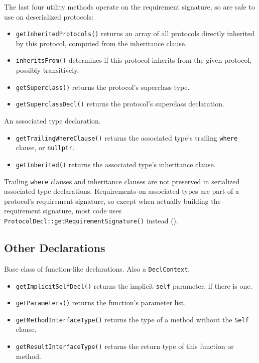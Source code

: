 \documentclass[../generics]{subfiles}
\begin{document}
The last four utility methods operate on the requirement signature, so are safe to use on deserialized protocols:
\begin{itemize}
\item \texttt{getInheritedProtocols()} returns an array of all protocols directly inherited by this protocol, computed from the inheritance clause.
\item \texttt{inheritsFrom()} determines if this protocol inherits from the given protocol, possibly transitively.
\item \texttt{getSuperclass()} returns the protocol's superclass type.
\item \texttt{getSuperclassDecl()} returns the protocol's superclass declaration.
\end{itemize}

An associated type declaration.
\begin{itemize}
\item \texttt{getTrailingWhereClause()} returns the associated type's trailing \texttt{where} clause, or \texttt{nullptr}.
\item \texttt{getInherited()} returns the associated type's inheritance clause.
\end{itemize}

Trailing \texttt{where} clauses and inheritance clauses are not preserved in serialized associated type declarations. Requirements on associated types are part of a protocol's requirement signature, so except when actually building the requirement signature, most code uses \texttt{ProtocolDecl::getRequirementSignature()} instead ().

\subsection*{Other Declarations}

Base class of function-like declarations. Also a \texttt{DeclContext}.
\begin{itemize}
\item \texttt{getImplicitSelfDecl()} returns the implicit \texttt{self} parameter, if there is one.
\item \texttt{getParameters()} returns the function's parameter list.
\item \texttt{getMethodInterfaceType()} returns the type of a method without the \texttt{Self} clause.
\item \texttt{getResultInterfaceType()} returns the return type of this function or method.
\end{itemize}
\end{document}
